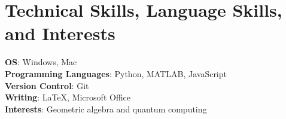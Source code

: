 \documentclass[letterpaper,10pt]{article}
\begin{document}
\section{Technical Skills, Language Skills, and Interests}
 \begin{itemize}[leftmargin=0.15in, label={}]
    \small{\item{
    \textbf{OS}{: Windows, Mac} \\
     \textbf{Programming Languages}{: Python, MATLAB, JavaScript} \\
     \textbf{Version Control}{: Git} \\
     \textbf{Writing}{: \LaTeX, Microsoft Office} \\
     \textbf{Interests}{: Geometric algebra and quantum computing}
     
    }}
 \end{itemize}

    
\end{document}
